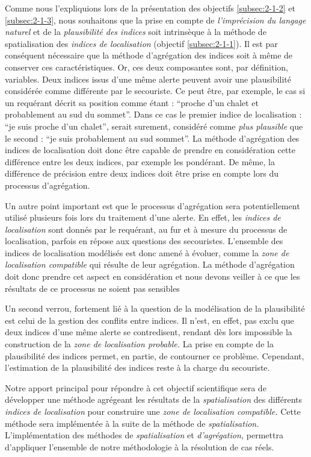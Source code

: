 Comme nous l'expliquions lors de la présentation des objectifs
\ref{subsec:2-1-2} et \ref{subsec:2-1-3}, nous souhaitons que la prise
en compte de \emph{l'imprécision du langage naturel} et de la
\emph{plausibilité des indices} soit intrinsèque à la méthode de
spatialisation des \emph{indices de localisation} (objectif
\ref{subsec:2-1-1}). Il est par conséquent nécessaire que la méthode
d'agrégation des indices soit à même de conserver ces
caractéristiques.
% 
Or, ces deux composantes sont, par définition, variables. Deux indices
issus d'une même alerte peuvent avoir une plausibilité considérée
comme différente par le secouriste. Ce peut être, par exemple, le cas
si un requérant décrit sa position comme étant : \enquote{proche d'un
  chalet et probablement au sud du sommet}. Dans ce cas le premier
indice de localisation : \enquote{je suis proche d'un chalet}, serait
surement, considéré comme \emph{plus plausible} que le second :
\enquote{je suis probablement au sud sommet}. La méthode d'agrégation
des indices de localisation doit donc être capable de prendre en
considération cette différence entre les deux indices, par exemple les
pondérant. De même, la différence de précision entre deux indices doit
être prise en compte lors du processus d'agrégation.

Un autre point important est que le processus d'agrégation sera
potentiellement utilisé plusieurs fois lors du traitement d'une
alerte. En effet, les \emph{indices de localisation} sont donnés par
le requérant, au fur et à mesure du processus de localisation, parfois
en répose aux questions des secouristes. L'ensemble des indices de
localisation modélisés est donc amené à évoluer, comme la \emph{zone
  de localisation compatible} qui résulte de leur agrégation. La
méthode d’agrégation doit donc prendre cet aspect en considération et
nous devons veiller à ce que les résultats de ce processus ne soient
pas sensibles

Un second verrou, fortement lié à la question de la modélisation de la
plausibilité est celui de la gestion des conflits entre indices. Il
n'est, en effet, pas exclu que deux indices d'une même alerte se
contredisent, rendant dès lors impossible la construction de la
\emph{zone de localisation probable.} La prise en compte de la
plausibilité des indices permet, en partie, de contourner ce
problème. Cependant, l'estimation de la plausibilité des indices reste
à la charge du secouriste.


Notre apport principal pour répondre à cet objectif scientifique sera
de développer une méthode agrégeant les résultats de la
\emph{spatialisation} des différents \emph{indices de localisation}
pour construire une \emph{zone de localisation compatible.}  Cette
méthode sera implémentée à la suite de la méthode de
\emph{spatialisation.} L'implémentation des méthodes de
\emph{spatialisation} et \emph{d'agrégation,} permettra d'appliquer
l'ensemble de notre méthodologie à la résolution de cas réels.

